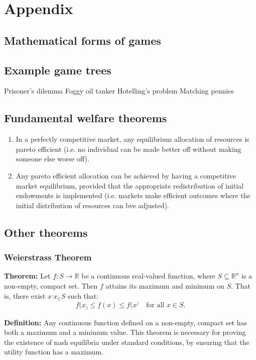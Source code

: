 \documentclass{article}
\begin{document}

\section{Appendix}

\subsection{Mathematical forms of games}

\subsection{Example game trees}
Prisoner's dilemma 
Foggy oil tanker 
Hotelling's problem 
Matching pennies 

\subsection{Fundamental welfare theorems}
\begin{enumerate}
    \item In a perfectly competitive market, any equilibrium allocation of resources is pareto efficient (i.e. no individual can be made better off without making someone else worse off).
    \item Any pareto efficient allocation can be achieved by having a competitive market equilibrium, provided that the appropriate redistribution of initial endowments is implemented (i.e. markets make efficient outcomes where the initial distribution of resources can bve adjusted). 
\end{enumerate}


\subsection{Other theorems}
\subsubsection{Weierstrass Theorem}\label{weiss}
\textbf{Theorem:} Let \(f: S \to \mathbb{R}\) be a continuous real-valued function, where \(S \subseteq \mathbb{R}^n\) is a non-empty, compact set. Then \(f\) attains its maximum and minimum on \(S\). That is, there exist \(x^, x_ \in S\) such that:
\[
f(x_) \leq f(x) \leq f(x^) \quad \text{for all } x \in S.
\]

\textbf{Definition:} Any continuous function defined on a non-empty, compact set has both a maximum and a minimum value. This theorem is necessary for proving the existence of nash equilibria under standard conditions, by ensuring that the utility function has a maximum. 
\end{document}
